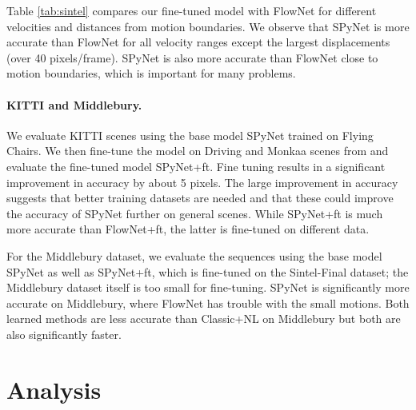 \documentclass[10pt,twocolumn,letterpaper]{article}
\begin{document}
Table \ref{tab:sintel} compares our fine-tuned model with FlowNet \cite{dosovitskiy2015flownet} for different velocities and distances from motion boundaries. 
We observe that SPyNet is more accurate than FlowNet for all velocity ranges  except the largest displacements (over 40 pixels/frame). 
SPyNet is also more accurate than FlowNet close to motion boundaries, which is important for many problems.  %

\paragraph{KITTI and Middlebury.}
We evaluate KITTI \cite{Geiger2012CVPR} scenes using the base model SPyNet trained on Flying Chairs. 
We then fine-tune the model on Driving and Monkaa scenes from \cite{sceneflowdataset} and evaluate the fine-tuned model SPyNet+ft. 
Fine tuning results in a significant improvement in accuracy by about 5 pixels.
The large improvement in accuracy suggests that better training datasets are needed and that these could improve the accuracy of SPyNet further on general scenes.
 While SPyNet+ft is much more accurate than FlowNet+ft, the latter is fine-tuned on different data.

For the Middlebury \cite{baker2011database} dataset, we evaluate the sequences using the base model SPyNet
as well as SPyNet+ft,  which is fine-tuned on the  Sintel-Final dataset;  the Middlebury dataset itself is too small for fine-tuning. 
SPyNet is significantly more accurate on Middlebury, where FlowNet has trouble with the small motions.
Both learned methods are less accurate than Classic+NL on Middlebury but both are also significantly faster.



\section{Analysis}
\end{document}
